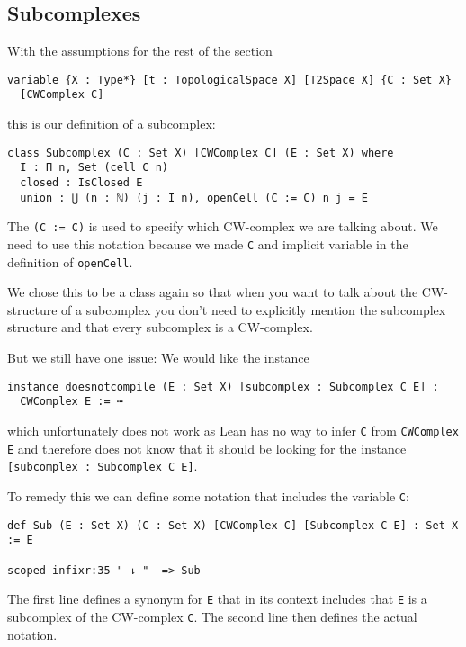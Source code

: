 \subsection{Subcomplexes}

With the assumptions for the rest of the section

\begin{lstlisting}
variable {X : Type*} [t : TopologicalSpace X] [T2Space X] {C : Set X} 
  [CWComplex C]
\end{lstlisting}

this is our definition of a subcomplex:

\begin{lstlisting}
class Subcomplex (C : Set X) [CWComplex C] (E : Set X) where
  I : Π n, Set (cell C n)
  closed : IsClosed E
  union : ⋃ (n : ℕ) (j : I n), openCell (C := C) n j = E
\end{lstlisting}

The \lstinline{(C := C)} is used to specify which CW-complex we are talking about. 
We need to use this notation because we made \lstinline{C} and implicit variable in the definition of \lstinline{openCell}.

We chose this to be a class again so that when you want to talk about the CW-structure of a subcomplex you don't need to explicitly mention the subcomplex structure and that every subcomplex is a CW-complex.

But we still have one issue: 
We would like the instance 

\begin{lstlisting}
instance doesnotcompile (E : Set X) [subcomplex : Subcomplex C E] : 
  CWComplex E := ⋯ 
\end{lstlisting}

which unfortunately does not work as Lean has no way to infer \lstinline{C} from \lstinline{CWComplex E} and therefore does not know that it should be looking for the instance \lstinline{[subcomplex : Subcomplex C E]}. 

To remedy this we can define some notation that includes the variable \lstinline{C}: 

\begin{lstlisting}
def Sub (E : Set X) (C : Set X) [CWComplex C] [Subcomplex C E] : Set X := E

scoped infixr:35 " ⇂ "  => Sub
\end{lstlisting}

The first line defines a synonym for \lstinline{E} that in its context includes that \lstinline{E} is a subcomplex of the CW-complex \lstinline{C}. 
The second line then defines the actual notation. 


